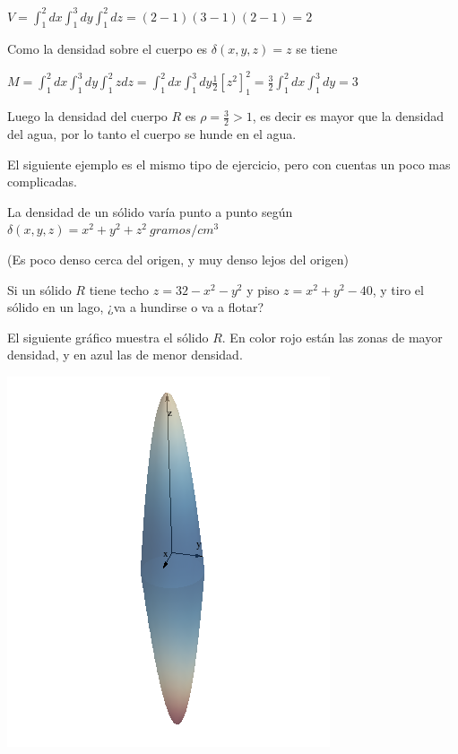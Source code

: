 $V = \int_1^2 dx \int_1^3 dy \int_1^2 dz = (2-1)(3-1)(2-1) = 2$

Como la densidad sobre el cuerpo es $\delta(x,y,z) = z$ se tiene 

$M = \int_1^2 dx \int_1^3 dy \int_1^2 z dz = \int_1^2 dx \int_1^3 dy \frac{1}{2} [z^2]_1^2 = \frac{3}{2} \int_1^2 dx \int_1^3 dy = 3 $

Luego la densidad del cuerpo $R$ es $\rho = \frac{3}{2} > 1$, es decir es mayor que la densidad del agua, por lo tanto el cuerpo se hunde en el agua.

El siguiente ejemplo es el mismo tipo de ejercicio, pero con cuentas un poco mas complicadas.

\begin{example}
La densidad de un sólido varía punto a punto según $\delta(x,y,z) = x^2 + y^2 + z^2 \ gramos/cm^3$

(Es poco denso cerca del origen, y muy denso lejos del origen)

Si un sólido $R$ tiene techo $z = 32 - x^2 - y^2$ y piso $z = x^2 + y^2 - 40$, y tiro el sólido en un lago, ¿va a hundirse o va a flotar?
\end{example}

El siguiente gráfico muestra el sólido $R$.  En color rojo están las zonas de mayor densidad, y en azul las de menor densidad.

\begin{center}
\includegraphics[scale=0.8]{images/04_analisis2/multiples2.png}
\end{center}

